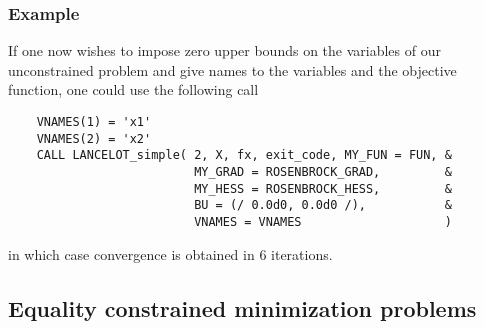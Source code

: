 \documentclass{article}
\begin{document}
\subsubsection*{Example}

If one now wishes to impose zero upper bounds on the variables of our
unconstrained problem and give names to the variables and the
objective function, one could use the following call
\begin{lstlisting}
    VNAMES(1) = 'x1'
    VNAMES(2) = 'x2'
    CALL LANCELOT_simple( 2, X, fx, exit_code, MY_FUN = FUN, &
                          MY_GRAD = ROSENBROCK_GRAD,         &
                          MY_HESS = ROSENBROCK_HESS,         &
                          BU = (/ 0.0d0, 0.0d0 /),           &
                          VNAMES = VNAMES                    )
\end{lstlisting}
\noindent
in which case convergence is obtained in 6 iterations.

\subsection{Equality constrained minimization problems}
\end{document}
